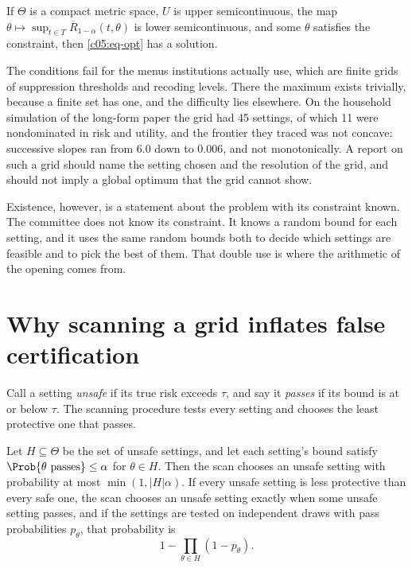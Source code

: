 \begin{proposition}[Existence]\label{c05:prop-exist}
If $\Theta$ is a compact metric space, $U$ is upper semicontinuous, the map
$\theta \mapsto \sup_{t\in T}\overline{R}_{1-\alpha}(t,\theta)$ is lower semicontinuous,
and some $\theta$ satisfies the constraint, then \eqref{c05:eq-opt} has a solution.
\end{proposition}

The conditions fail for the menus institutions actually use, which are finite grids of
suppression thresholds and recoding levels. There the maximum exists trivially, because a
finite set has one, and the difficulty lies elsewhere. On the household simulation of the
long-form paper the grid had 45 settings, of which 11 were nondominated in risk and
utility, and the frontier they traced was not concave: successive slopes ran from 6.0
down to 0.006, and not monotonically.
A report on such a grid should name the setting chosen and the resolution of the grid,
and should not imply a global optimum that the grid cannot show.

Existence, however, is a statement about the problem with its constraint known. The
committee does not know its constraint. It knows a random bound for each setting, and
it uses the same random bounds both to decide which settings are feasible and to pick
the best of them. That double use is where the arithmetic of the opening comes from.

\section{Why scanning a grid inflates false certification}

Call a setting \emph{unsafe} if its true risk exceeds $\tau$, and say it \emph{passes} if
its bound is at or below $\tau$. The scanning procedure tests every setting and chooses
the least protective one that passes.

\begin{proposition}\label{c05:prop-scan}
Let $H \subseteq \Theta$ be the set of unsafe settings, and let each setting's bound
satisfy $\Prob\{\theta \text{ passes}\} \le \alpha$ for $\theta \in H$. Then the scan
chooses an unsafe setting with probability at most $\min(1, |H|\alpha)$. If every unsafe
setting is less protective than every safe one, the scan chooses an unsafe setting
exactly when some unsafe setting passes, and if the settings are tested on independent
draws with pass probabilities $p_\theta$, that probability is
\begin{equation}\label{c05:eq-scan}
1 - \prod_{\theta \in H}(1 - p_\theta).
\end{equation}
\end{proposition}

